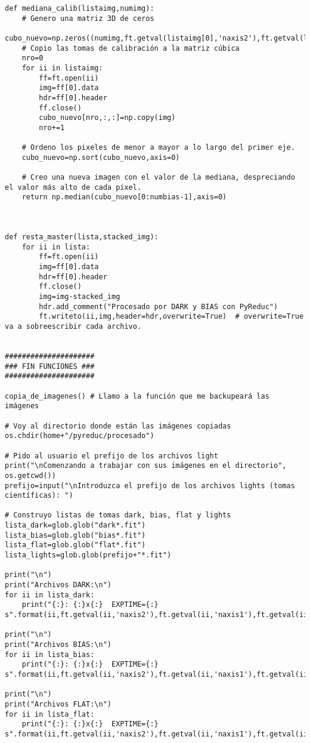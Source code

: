 \begin{lstlisting}[style=python]
def mediana_calib(listaimg,numimg):
    # Genero una matriz 3D de ceros
    cubo_nuevo=np.zeros((numimg,ft.getval(listaimg[0],'naxis2'),ft.getval(listaimg[0],'naxis1')),dtype=float)
    # Copio las tomas de calibración a la matriz cúbica
    nro=0
    for ii in listaimg:
        ff=ft.open(ii)
        img=ff[0].data
        hdr=ff[0].header
        ff.close()
        cubo_nuevo[nro,:,:]=np.copy(img)
        nro+=1
        
    # Ordeno los pixeles de menor a mayor a lo largo del primer eje.
    cubo_nuevo=np.sort(cubo_nuevo,axis=0)
    
    # Creo una nueva imagen con el valor de la mediana, despreciando el valor más alto de cada pixel.
    return np.median(cubo_nuevo[0:numbias-1],axis=0)


            
def resta_master(lista,stacked_img):
    for ii in lista:
        ff=ft.open(ii)
        img=ff[0].data
        hdr=ff[0].header
        ff.close()
        img=img-stacked_img
        hdr.add_comment("Procesado por DARK y BIAS con PyReduc")
        ft.writeto(ii,img,header=hdr,overwrite=True)  # overwrite=True va a sobreescribir cada archivo.


#####################
### FIN FUNCIONES ###
#####################

copia_de_imagenes() # Llamo a la función que me backupeará las imágenes

# Voy al directorio donde están las imágenes copiadas
os.chdir(home+"/pyreduc/procesado")

# Pido al usuario el prefijo de los archivos light
print("\nComenzando a trabajar con sus imágenes en el directorio", os.getcwd())
prefijo=input("\nIntroduzca el prefijo de los archivos lights (tomas científicas): ")

# Construyo listas de tomas dark, bias, flat y lights
lista_dark=glob.glob("dark*.fit")
lista_bias=glob.glob("bias*.fit")
lista_flat=glob.glob("flat*.fit")
lista_lights=glob.glob(prefijo+"*.fit")

print("\n")
print("Archivos DARK:\n")
for ii in lista_dark:
    print("{:}: {:}x{:}  EXPTIME={:} s".format(ii,ft.getval(ii,'naxis2'),ft.getval(ii,'naxis1'),ft.getval(ii,'exptime')))

print("\n")
print("Archivos BIAS:\n")
for ii in lista_bias:
    print("{:}: {:}x{:}  EXPTIME={:} s".format(ii,ft.getval(ii,'naxis2'),ft.getval(ii,'naxis1'),ft.getval(ii,'exptime')))    

print("\n")
print("Archivos FLAT:\n")
for ii in lista_flat:
    print("{:}: {:}x{:}  EXPTIME={:} s".format(ii,ft.getval(ii,'naxis2'),ft.getval(ii,'naxis1'),ft.getval(ii,'exptime')))    


\end{lstlisting}
